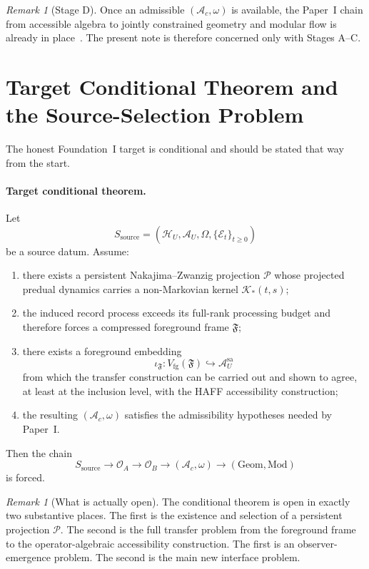 \documentclass[12pt]{article}
\theoremstyle{definition}
\theoremstyle{remark}
\newtheorem{remark}[theorem]{Remark}
\begin{document}
\begin{remark}[Stage D]
Once an admissible \((\mathcal A_c,\omega)\) is available, the
Paper~I chain from accessible algebra to jointly constrained geometry
and modular flow is already in place~\cite{PaperI}. The present note is
therefore concerned only with Stages A--C.
\end{remark}

\section{Target Conditional Theorem and the Source-Selection Problem}\label{sec:target}

The honest Foundation~I target is conditional and should be stated that
way from the start.

\paragraph{Target conditional theorem.}
Let
\[
S_{\mathrm{source}}
=
(\mathcal H_U,\mathcal A_U,\Omega,\{\mathcal E_t\}_{t\ge 0})
\]
be a source datum. Assume:
\begin{enumerate}
\item there exists a persistent Nakajima--Zwanzig projection
  \(\mathcal P\) whose projected predual dynamics carries a
  non-Markovian kernel \(\mathcal K_*(t,s)\);
\item the induced record process exceeds its full-rank processing budget
  and therefore forces a compressed foreground frame \(\mathfrak F\);
\item there exists a foreground embedding
  \[
  \iota_{\mathfrak F}:V_{\mathrm{fg}}(\mathfrak F)\hookrightarrow
  \mathcal A_U^{\mathrm{sa}}
  \]
  from which the transfer construction can be carried out and shown to
  agree, at least at the inclusion level, with the HAFF accessibility
  construction;
\item the resulting \((\mathcal A_c,\omega)\) satisfies the
  admissibility hypotheses needed by Paper~I.
\end{enumerate}
Then the chain
\[
S_{\mathrm{source}}
\to
\mathcal O_A
\to
\mathcal O_B
\to
(\mathcal A_c,\omega)
\to
(\mathrm{Geom},\mathrm{Mod})
\]
is forced.

\begin{remark}[What is actually open]
The conditional theorem is open in exactly two substantive places. The
first is the existence and selection of a persistent projection
\(\mathcal P\). The second is the full transfer problem from the
foreground frame to the operator-algebraic accessibility construction.
The first is an observer-emergence problem. The second is the main new
interface problem.
\end{remark}
\end{document}
